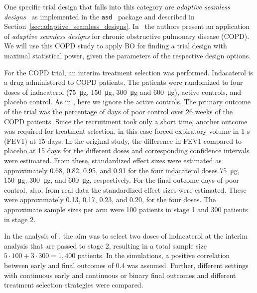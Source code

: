 \documentclass[bimj,fleqn]{w-art}
\theoremstyle{plain}
\theoremstyle{definition}
\begin{document}
One specific trial design that falls into this category are \emph{adaptive seamless designs}~\citep{barnes_integrating_2010} as implemented in the \texttt{asd}~\cite{parsons_software_2011} package and described in Section~\ref{sec:adaptive_seamless_designs}.
In~\citet{friede_adaptive_2020} the authors present an application of \emph{adaptive seamless designs} for chronic obstructive pulmonary disease (COPD).
We will use this COPD study to apply BO for finding a trial design with maximal statistical power, given the parameters of the respective design options.


For the COPD trial, an interim treatment selection was performed. 
Indacaterol is a drug administered to COPD patients.
The patients were randomized to four doses of indacaterol (\SI{75}{\micro\gram}, \SI{150}{\micro\gram}, \SI{300}{\micro\gram} and \SI{600}{\micro\gram}), active controls, and placebo control.
As in \citet{friede_adaptive_2020}, here we ignore the active controls.
The primary outcome of the trial was the percentage of days of poor control over 26 weeks of the COPD patients.
Since the recruitment took only a short time, another outcome was required for treatment selection, in this case forced expiratory volume in 1 s (FEV1) at 15 days.
In the original study, the difference in FEV1 compared to placebo at 15 days for the different doses and corresponding confidence intervals were estimated.
From these, standardized effect sizes were estimated as approximately 0.68, 0.82, 0.95, and 0.91 for the four  indacaterol doses \SI{75}{\micro\gram}, \SI{150}{\micro\gram}, \SI{300}{\micro\gram}, and \SI{600}{\micro\gram}, respectively.
For the final outcome days of poor control, also, from real data the standardized effect sizes were estimated.
These were approximately 0.13, 0.17, 0.23, and 0.20, for the four doses.
The approximate sample sizes per arm were 100 patients in stage 1 and 300 patients in stage 2.

In the analysis of \citet{friede_adaptive_2020}, the aim was to select two doses of indacaterol at the interim analysis that are passed to stage 2, resulting in a total sample size $5 \cdot 100 + 3 \cdot 300 = 1,400$ patients. 
In the simulations, a positive correlation between early and final outcomes of 0.4 was assumed.
Further, different settings with continuous early and continuous or binary final outcomes and different treatment selection strategies were compared.
\end{document}
